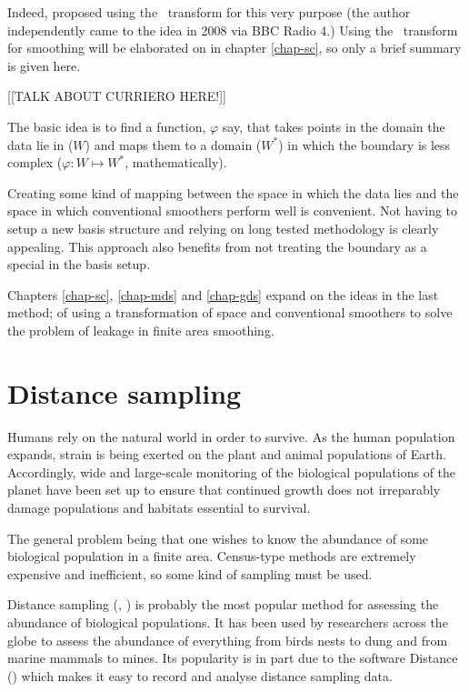 \begin{enumerate}
Indeed,  proposed using the \sch\ transform for this very purpose (the author independently came to the idea in 2008 via BBC Radio 4.) Using the \sch\ transform for smoothing will be elaborated on in chapter \ref{chap-sc}, so only a brief summary is given here.

[[TALK ABOUT CURRIERO HERE!]]

The basic idea is to find a function, $\varphi$ say, that takes points in the domain the data lie in ($W$) and maps them to a domain ($W^*$) in which the boundary is less complex ($\varphi : W \mapsto W^*$, mathematically).

Creating some kind of mapping between the space in which the data lies and the space in which conventional smoothers perform well is convenient. Not having to setup a new basis structure and relying on long tested methodology is clearly appealing. This approach also benefits from not treating the boundary as a special in the basis setup.
\end{enumerate}

Chapters \ref{chap-sc}, \ref{chap-mds} and \ref{chap-gds} expand on the ideas in the last method; of using a transformation of space and conventional smoothers to solve the problem of leakage in finite area smoothing.




\section{Distance sampling}
\label{intro-DS}

Humans rely on the natural world in order to survive. As the human population expands, strain is being exerted on the plant and animal populations of Earth. Accordingly, wide and large-scale monitoring of the biological populations of the planet have been set up to ensure that continued growth does not irreparably damage populations and habitats essential to survival.

The general problem being that one wishes to know the abundance of some biological population in a finite area. Census-type methods are extremely expensive and inefficient, so some kind of sampling must be used. 

Distance sampling (\cite{IDS}, \cite{ADS}) is probably the most popular method for assessing the abundance of biological populations. It has been used by researchers across the globe to assess the abundance of everything from birds nests to dung and from marine mammals to mines. Its popularity is in part due to the software Distance (\cite{distance-software}) which makes it easy to record and analyse distance sampling data.

